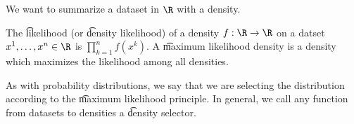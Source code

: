 

We want to summarize a dataset in $\R$ with a density.


The \t{likelihood} (or \t{density likelihood}) of a density $f: \R  \to \R$ on a datset $x^1, \dots , x^n \in \R$ is $\prod_{k = 1}^{n} f(x^k)$.
A \t{maximum likelihood density} is a density which maximizes the likelihood among all densities.

As with probability distributions, we say that we are selecting the distribution according to the \t{maximum likelihood principle}.
In general, we call any function from datasets to densities a \t{density selector}.

\blankpage
